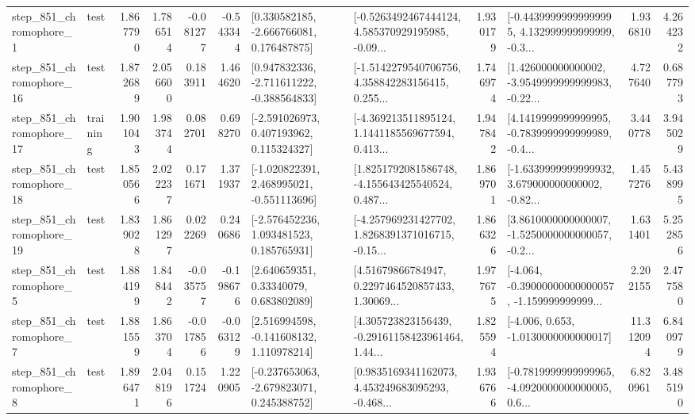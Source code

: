 \begin{tabular}{llrrrrllrlrr}
   step\_851\_chromophore\_1 &      test &      1.867790 &    1.786514 &     -0.081277 & -0.543344 &    [0.330582185, -2.666766081, 0.176487875] &  [-0.5263492467444124, 4.585370929195985, -0.09... &       1.930179 &  [-0.44399999999999995, 4.132999999999999, -0.3... &            1.936810 &          4.264232 \\
  step\_851\_chromophore\_16 &      test &      1.872689 &    2.056600 &      0.183911 &  1.464620 &   [0.947832336, -2.711611222, -0.388564833] &  [-1.5142279540706756, 4.358842283156415, 0.255... &       1.746974 &  [1.426000000000002, -3.9549999999999983, -0.22... &            4.727640 &          0.687793 \\
  step\_851\_chromophore\_17 &  training &      1.901043 &    1.983744 &      0.082701 &  0.698270 &    [-2.591026973, 0.407193962, 0.115324327] &  [-4.369213511895124, 1.1441185569677594, 0.413... &       1.947842 &  [4.1419999999999995, -0.7839999999999989, -0.4... &            3.440778 &          3.945029 \\
  step\_851\_chromophore\_18 &      test &      1.850566 &    2.022237 &      0.171671 &  1.371937 &   [-1.020822391, 2.468995021, -0.551113696] &  [1.8251792081586748, -4.155643425540524, 0.487... &       1.869701 &  [-1.6339999999999932, 3.679000000000002, -0.82... &            1.457276 &          5.438995 \\
  step\_851\_chromophore\_19 &      test &      1.839028 &    1.861297 &      0.022269 &  0.240686 &    [-2.576452236, 1.093481523, 0.185765931] &  [-4.257969231427702, 1.8268391371016715, -0.15... &       1.866326 &  [3.8610000000000007, -1.5250000000000057, -0.2... &            1.631401 &          5.252856 \\
   step\_851\_chromophore\_5 &      test &      1.884199 &    1.848442 &     -0.035757 & -0.198676 &      [2.640659351, 0.33340079, 0.683802089] &  [4.51679866784947, 0.2297464520857433, 1.30069... &       1.977675 &  [-4.064, -0.39000000000000057, -1.159999999999... &            2.202155 &          2.477580 \\
   step\_851\_chromophore\_7 &      test &      1.881559 &    1.863704 &     -0.017856 & -0.063129 &    [2.516994598, -0.141608132, 1.110978214] &  [4.305723823156439, -0.29161158423961464, 1.44... &       1.825594 &               [-4.006, 0.653, -1.0130000000000017] &           11.312094 &          6.840979 \\
   step\_851\_chromophore\_8 &      test &      1.896471 &    2.048196 &      0.151724 &  1.220905 &   [-0.237653063, -2.679823071, 0.245388752] &  [0.9835169341162073, 4.453249683095293, -0.468... &       1.936766 &  [-0.7819999999999965, -4.0920000000000005, 0.6... &            6.820961 &          3.485190 \\

\end{tabular}
